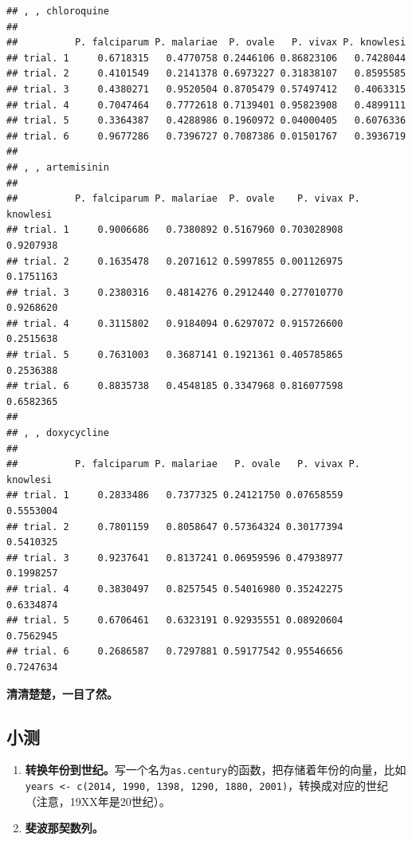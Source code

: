 \documentclass[]{book}
\providecommand{\tightlist}{%
  \setlength{\itemsep}{0pt}\setlength{\parskip}{0pt}}
\begin{document}
\begin{verbatim}
## , , chloroquine
## 
##          P. falciparum P. malariae  P. ovale   P. vivax P. knowlesi
## trial. 1     0.6718315   0.4770758 0.2446106 0.86823106   0.7428044
## trial. 2     0.4101549   0.2141378 0.6973227 0.31838107   0.8595585
## trial. 3     0.4380271   0.9520504 0.8705479 0.57497412   0.4063315
## trial. 4     0.7047464   0.7772618 0.7139401 0.95823908   0.4899111
## trial. 5     0.3364387   0.4288986 0.1960972 0.04000405   0.6076336
## trial. 6     0.9677286   0.7396727 0.7087386 0.01501767   0.3936719
## 
## , , artemisinin
## 
##          P. falciparum P. malariae  P. ovale    P. vivax P. knowlesi
## trial. 1     0.9006686   0.7380892 0.5167960 0.703028908   0.9207938
## trial. 2     0.1635478   0.2071612 0.5997855 0.001126975   0.1751163
## trial. 3     0.2380316   0.4814276 0.2912440 0.277010770   0.9268620
## trial. 4     0.3115802   0.9184094 0.6297072 0.915726600   0.2515638
## trial. 5     0.7631003   0.3687141 0.1921361 0.405785865   0.2536388
## trial. 6     0.8835738   0.4548185 0.3347968 0.816077598   0.6582365
## 
## , , doxycycline
## 
##          P. falciparum P. malariae   P. ovale   P. vivax P. knowlesi
## trial. 1     0.2833486   0.7377325 0.24121750 0.07658559   0.5553004
## trial. 2     0.7801159   0.8058647 0.57364324 0.30177394   0.5410325
## trial. 3     0.9237641   0.8137241 0.06959596 0.47938977   0.1998257
## trial. 4     0.3830497   0.8257545 0.54016980 0.35242275   0.6334874
## trial. 5     0.6706461   0.6323191 0.92935551 0.08920604   0.7562945
## trial. 6     0.2686587   0.7297881 0.59177542 0.95546656   0.7247634
\end{verbatim}

\textbf{清清楚楚，一目了然。}

\hypertarget{test-base}{%
\subsection{小测}\label{test-base}}

\begin{enumerate}
\def\labelenumi{(\arabic{enumi})}
\tightlist
\item
  \textbf{转换年份到世纪。}写一个名为\texttt{as.century}的函数，把存储着年份的向量，比如\texttt{years\ \textless{}-\ c(2014,\ 1990,\ 1398,\ 1290,\ 1880,\ 2001)}，转换成对应的世纪（注意，19XX年是20世纪）。
\item
  \textbf{斐波那契数列。}
\end{enumerate}
\end{document}
